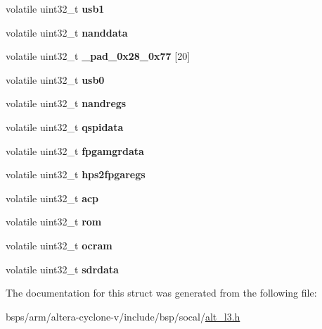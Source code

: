 \begin{DoxyCompactItemize}
\item 
\mbox{\label{structALT__L3__SECGRP__raw__s_acb37ebb24ee778abf8ea692b7672bdb4}} 
volatile uint32\+\_\+t {\bfseries usb1}
\item 
\mbox{\label{structALT__L3__SECGRP__raw__s_ad8111aa8982fbdd83d37e3413ed1b428}} 
volatile uint32\+\_\+t {\bfseries nanddata}
\item 
\mbox{\label{structALT__L3__SECGRP__raw__s_aaed38d77ff31f9c58d8fac2a5919e45c}} 
volatile uint32\+\_\+t {\bfseries \+\_\+pad\+\_\+0x28\+\_\+0x77} \mbox{[}20\mbox{]}
\item 
\mbox{\label{structALT__L3__SECGRP__raw__s_a65c12ddd135a8a3d3debf94292750cd3}} 
volatile uint32\+\_\+t {\bfseries usb0}
\item 
\mbox{\label{structALT__L3__SECGRP__raw__s_ae0399b1f965475b65cee11a9c32e751c}} 
volatile uint32\+\_\+t {\bfseries nandregs}
\item 
\mbox{\label{structALT__L3__SECGRP__raw__s_a7ff5c1f81cc893aed2b79f3135af0451}} 
volatile uint32\+\_\+t {\bfseries qspidata}
\item 
\mbox{\label{structALT__L3__SECGRP__raw__s_a8c21323c05931a463d0977f7ecfc8b3f}} 
volatile uint32\+\_\+t {\bfseries fpgamgrdata}
\item 
\mbox{\label{structALT__L3__SECGRP__raw__s_adb1d593f8790d66c5f92fdb0e52904d2}} 
volatile uint32\+\_\+t {\bfseries hps2fpgaregs}
\item 
\mbox{\label{structALT__L3__SECGRP__raw__s_adf12df03570906a342644aa4b930c4b9}} 
volatile uint32\+\_\+t {\bfseries acp}
\item 
\mbox{\label{structALT__L3__SECGRP__raw__s_a6349945e2503451e38a1cce738a2a037}} 
volatile uint32\+\_\+t {\bfseries rom}
\item 
\mbox{\label{structALT__L3__SECGRP__raw__s_a5b07a59472f43963e57d58caa123971b}} 
volatile uint32\+\_\+t {\bfseries ocram}
\item 
\mbox{\label{structALT__L3__SECGRP__raw__s_a3a3d0457652d5b1dc468cfe7f20f8d56}} 
volatile uint32\+\_\+t {\bfseries sdrdata}
\end{DoxyCompactItemize}


The documentation for this struct was generated from the following file\+:\begin{DoxyCompactItemize}
\item 
bsps/arm/altera-\/cyclone-\/v/include/bsp/socal/\mbox{\hyperlink{alt__l3_8h}{alt\+\_\+l3.\+h}}\end{DoxyCompactItemize}
